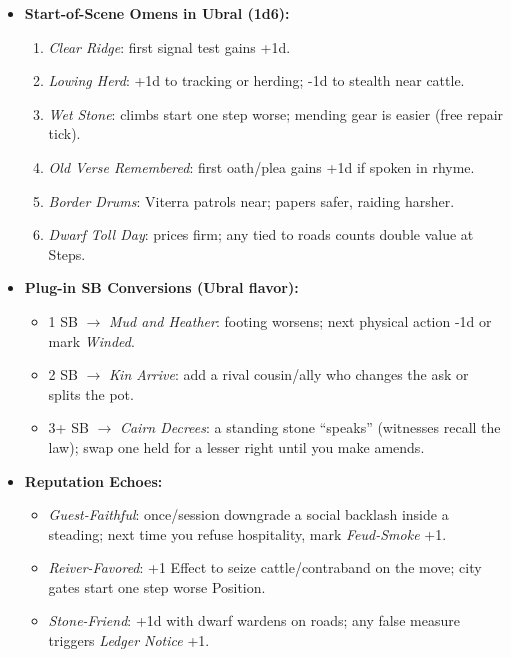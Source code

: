 \begin{itemize}
  \item \textbf{Start-of-Scene Omens in Ubral (1d6):}
  \begin{enumerate}
    \item \emph{Clear Ridge}: first signal test gains +1d.
    \item \emph{Lowing Herd}: +1d to tracking or herding; -1d to stealth near cattle.
    \item \emph{Wet Stone}: climbs start one step worse; mending gear is easier (free repair tick).
    \item \emph{Old Verse Remembered}: first oath/plea gains +1d if spoken in rhyme.
    \item \emph{Border Drums}: Viterra patrols near; papers safer, raiding harsher.
    \item \emph{Dwarf Toll Day}: prices firm; any \Diamond{} tied to roads counts double value at Steps.
  \end{enumerate}

  \item \textbf{Plug-in SB Conversions (Ubral flavor):}
  \begin{itemize}
    \item 1 SB \(\rightarrow\) \emph{Mud and Heather}: footing worsens; next physical action -1d or mark \emph{Winded}.
    \item 2 SB \(\rightarrow\) \emph{Kin Arrive}: add a rival cousin/ally who changes the ask or splits the pot.
    \item 3+ SB \(\rightarrow\) \emph{Cairn Decrees}: a standing stone “speaks” (witnesses recall the law); swap one held \Diamond{} for a lesser right until you make amends.
  \end{itemize}

  \item \textbf{Reputation Echoes:}
  \begin{itemize}
    \item \emph{Guest-Faithful}: once/session downgrade a social backlash inside a steading; next time you refuse hospitality, mark \emph{Feud-Smoke} +1.
    \item \emph{Reiver-Favored}: +1 Effect to seize cattle/contraband on the move; city gates start one step worse Position.
    \item \emph{Stone-Friend}: +1d with dwarf wardens on roads; any false measure triggers \emph{Ledger Notice} +1.
  \end{itemize}
\end{itemize}